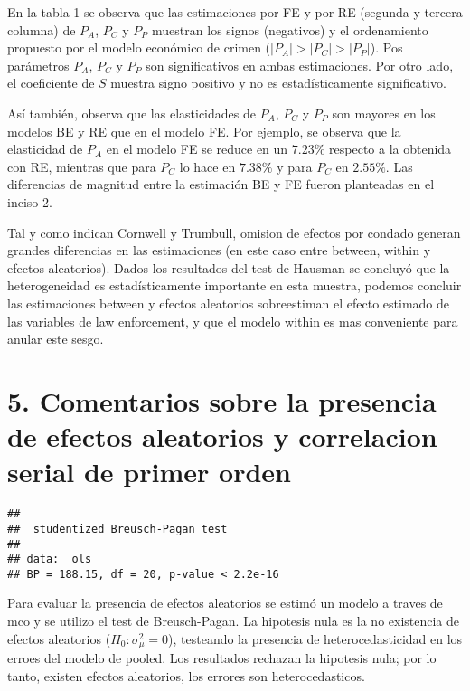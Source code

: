 \documentclass[
]{article}
\begin{document}
En la tabla 1 se observa que las estimaciones por FE y por RE (segunda y
tercera columna) de \(P_A\), \(P_C\) y \(P_P\) muestran los signos
(negativos) y el ordenamiento propuesto por el modelo económico de
crimen (\(|P_A|>|P_C|>|P_P|\)). Pos parámetros \(P_A\), \(P_C\) y
\(P_P\) son significativos en ambas estimaciones. Por otro lado, el
coeficiente de \(S\) muestra signo positivo y no es estadísticamente
significativo.

Así también, observa que las elasticidades de \(P_A\), \(P_C\) y \(P_P\)
son mayores en los modelos BE y RE que en el modelo FE. Por ejemplo, se
observa que la elasticidad de \(P_A\) en el modelo FE se reduce en un
\(7.23\%\) respecto a la obtenida con RE, mientras que para \(P_C\) lo
hace en \(7.38\%\) y para \(P_C\) en \(2.55\%\). Las diferencias de
magnitud entre la estimación BE y FE fueron planteadas en el inciso 2.

Tal y como indican Cornwell y Trumbull, omision de efectos por condado
generan grandes diferencias en las estimaciones (en este caso entre
between, within y efectos aleatorios). Dados los resultados del test de
Hausman se concluyó que la heterogeneidad es estadísticamente importante
en esta muestra, podemos concluir las estimaciones between y efectos
aleatorios sobreestiman el efecto estimado de las variables de law
enforcement, y que el modelo within es mas conveniente para anular este
sesgo.

\hypertarget{comentarios-sobre-la-presencia-de-efectos-aleatorios-y-correlacion-serial-de-primer-orden}{%
\section{5. Comentarios sobre la presencia de efectos aleatorios y
correlacion serial de primer
orden}\label{comentarios-sobre-la-presencia-de-efectos-aleatorios-y-correlacion-serial-de-primer-orden}}

\begin{verbatim}
## 
##  studentized Breusch-Pagan test
## 
## data:  ols
## BP = 188.15, df = 20, p-value < 2.2e-16
\end{verbatim}

Para evaluar la presencia de efectos aleatorios se estimó un modelo a
traves de mco y se utilizo el test de Breusch-Pagan. La hipotesis nula
es la no existencia de efectos aleatorios (\(H_0: \sigma^2_\mu=0\)),
testeando la presencia de heterocedasticidad en los erroes del modelo de
pooled. Los resultados rechazan la hipotesis nula; por lo tanto, existen
efectos aleatorios, los errores son heterocedasticos.
\end{document}
